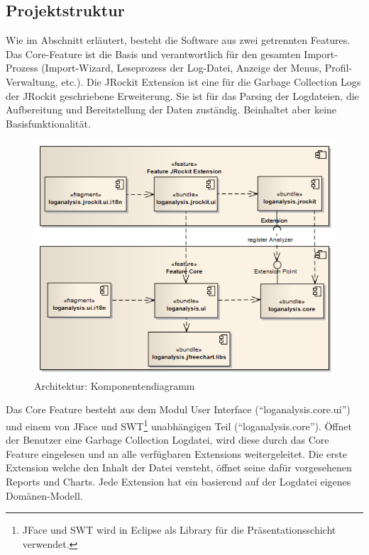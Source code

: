 \subsection{Projektstruktur}\label{projektstruktur}
Wie im Abschnitt  erläutert, besteht die Software aus zwei getrennten Features. Das Core-Feature ist die Basis und verantwortlich für den gesamten Import-Prozess (Import-Wizard, Leseprozess der Log-Datei, Anzeige der Menus, Profil-Verwaltung, etc.). Die JRockit Extension ist eine für die Garbage Collection Logs der JRockit geschriebene Erweiterung. Sie ist für das Parsing der Logdateien, die Aufbereitung und Bereitstellung der Daten zuständig. Beinhaltet aber keine Basisfunktionalität.
 \begin{figure}[H]
  	\centering
    	\includegraphics[width=14cm]{images/architektur_komponenten_uebersicht}
        	\caption{Architektur: Komponentendiagramm}
\end{figure}

Das Core Feature besteht aus dem Modul User Interface (``loganalysis.core.ui'') und einem von JFace und SWT\footnote{JFace und SWT wird in Eclipse als Library für die Präsentationsschicht verwendet.} unabhängigen Teil (``loganalysis.core''). Öffnet der Benutzer eine Garbage Collection Logdatei, wird diese durch das Core Feature eingelesen und an alle verfügbaren Extensions weitergeleitet. Die erste Extension welche den Inhalt der Datei versteht, öffnet seine dafür vorgesehenen Reports und Charts. Jede Extension hat ein basierend auf der Logdatei eigenes Domänen-Modell.


